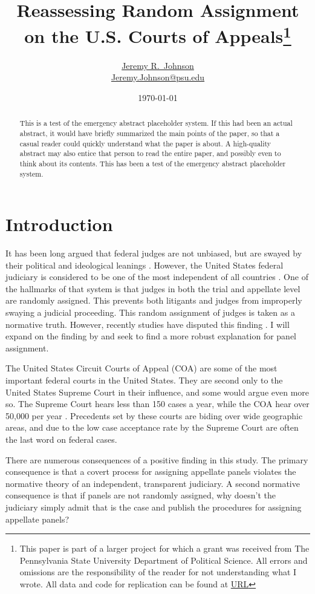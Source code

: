 \documentclass[12pt]{article}
\title{Reassessing Random Assignment on the U.S. Courts of Appeals\footnote{This paper is part of a larger project for which a grant was received from The Pennsylvania State University Department of Political Science.  All errors and omissions are the responsibility of the reader for not understanding what I wrote.  All data and code for replication can be found at \url{URL} } }
\author{\href{http://www.jeremyrjohnson.org/}{Jeremy R.\ Johnson}\\ \href{mailto:Jeremy.Johnson@psu.edu}{Jeremy.Johnson@psu.edu}}
\affil{Pennsylvania State University}
\date{\today}
\begin{document}
\clearpage\maketitle\thispagestyle{empty}


\begin{abstract}
	\medskip
	This is a test of the emergency abstract placeholder system.  If this had been an actual abstract, it would have briefly summarized the main points of the paper, so that a casual reader could quickly understand what the paper is about.  A high-quality abstract may also entice that person to read the entire paper, and possibly even to think about its contents.  This has been a test of the emergency abstract placeholder system. \\
\end{abstract}

\clearpage
\setcounter{page}{1}
\setcounter{footnote}{0}
\renewcommand*{\thefootnote}{\arabic{footnote}}
\addtolength{\footnotesep}{6pt}

\section*{Introduction}
It has been long argued that federal judges are not unbiased, but are swayed by their political and ideological leanings \citep{segal2002supreme}.  However, the United States federal judiciary is considered to be one of the most independent of all countries \citep{Linzer2014}.  One of the hallmarks of that system is that judges in both the trial and appellate level are randomly assigned.  This prevents both litigants and judges from improperly swaying a judicial proceeding.  This random assignment of judges is taken as a normative truth.  However, recently studies have disputed this finding \citep{Chilton2014}.  I will expand on the finding by \citeauthor{Chilton2014} and seek to find a more robust explanation for panel assignment.

The United States Circuit Courts of Appeal (COA) are some of the most important federal courts in the United States.  They are second only to the United States Supreme Court in their influence, and some would argue even more so.  The Supreme Court hears less than 150 cases a year, while the COA hear over 50,000 per year \citep{Caseloadstats}.  Precedents set by these courts are biding over wide geographic areas, and due to the low case acceptance rate by the Supreme Court are often the last word on federal cases.

There are numerous consequences of a positive finding in this study.  The primary consequence is that a covert process for assigning appellate panels violates the normative theory of an independent, transparent judiciary.  A second normative consequence is that if panels are not randomly assigned, why doesn't the judiciary simply admit that is the case and publish the procedures for assigning appellate panels?  
\end{document}
